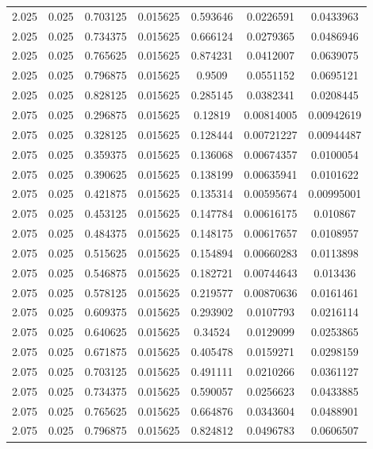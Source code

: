 \begin{table}[bh]
\begin{center}
{\begin{tabular}{ccccccc}
2.025	 & 0.025 & 	0.703125	 & 0.015625	 & 0.593646	 & 0.0226591	 & 0.0433963 \\ 
2.025	 & 0.025 & 	0.734375	 & 0.015625	 & 0.666124	 & 0.0279365	 & 0.0486946 \\ 
2.025	 & 0.025 & 	0.765625	 & 0.015625	 & 0.874231	 & 0.0412007	 & 0.0639075 \\ 
2.025	 & 0.025 & 	0.796875	 & 0.015625	 & 0.9509	 & 0.0551152	 & 0.0695121 \\ 
2.025	 & 0.025 & 	0.828125	 & 0.015625	 & 0.285145	 & 0.0382341	 & 0.0208445 \\ 
2.075	 & 0.025 & 	0.296875	 & 0.015625	 & 0.12819	 & 0.00814005	 & 0.00942619 \\ 
2.075	 & 0.025 & 	0.328125	 & 0.015625	 & 0.128444	 & 0.00721227	 & 0.00944487 \\ 
2.075	 & 0.025 & 	0.359375	 & 0.015625	 & 0.136068	 & 0.00674357	 & 0.0100054 \\ 
2.075	 & 0.025 & 	0.390625	 & 0.015625	 & 0.138199	 & 0.00635941	 & 0.0101622 \\ 
2.075	 & 0.025 & 	0.421875	 & 0.015625	 & 0.135314	 & 0.00595674	 & 0.00995001 \\ 
2.075	 & 0.025 & 	0.453125	 & 0.015625	 & 0.147784	 & 0.00616175	 & 0.010867 \\ 
2.075	 & 0.025 & 	0.484375	 & 0.015625	 & 0.148175	 & 0.00617657	 & 0.0108957 \\ 
2.075	 & 0.025 & 	0.515625	 & 0.015625	 & 0.154894	 & 0.00660283	 & 0.0113898 \\ 
2.075	 & 0.025 & 	0.546875	 & 0.015625	 & 0.182721	 & 0.00744643	 & 0.013436 \\ 
2.075	 & 0.025 & 	0.578125	 & 0.015625	 & 0.219577	 & 0.00870636	 & 0.0161461 \\ 
2.075	 & 0.025 & 	0.609375	 & 0.015625	 & 0.293902	 & 0.0107793	 & 0.0216114 \\ 
2.075	 & 0.025 & 	0.640625	 & 0.015625	 & 0.34524	 & 0.0129099	 & 0.0253865 \\ 
2.075	 & 0.025 & 	0.671875	 & 0.015625	 & 0.405478	 & 0.0159271	 & 0.0298159 \\ 
2.075	 & 0.025 & 	0.703125	 & 0.015625	 & 0.491111	 & 0.0210266	 & 0.0361127 \\ 
2.075	 & 0.025 & 	0.734375	 & 0.015625	 & 0.590057	 & 0.0256623	 & 0.0433885 \\ 
2.075	 & 0.025 & 	0.765625	 & 0.015625	 & 0.664876	 & 0.0343604	 & 0.0488901 \\ 
2.075	 & 0.025 & 	0.796875	 & 0.015625	 & 0.824812	 & 0.0496783	 & 0.0606507 \\ 

\end{tabular}}
\end{center}
\end{table}

